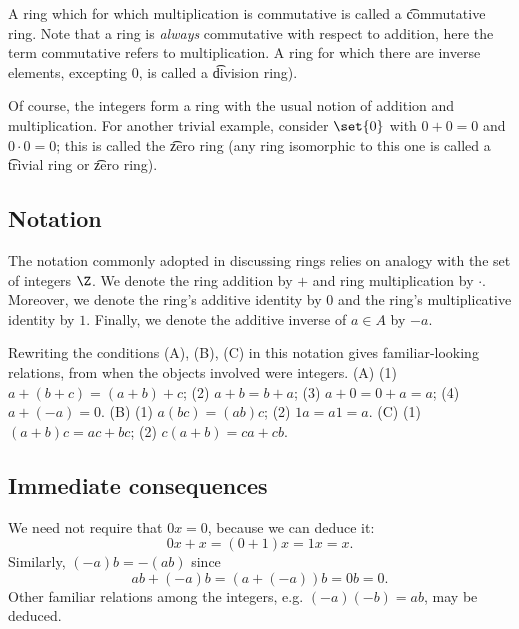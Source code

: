 A ring which for which multiplication is commutative is called a \t{commutative ring}.
Note that a ring is \textit{always} commutative with respect to addition, here the term commutative refers to multiplication.
A ring for which there are inverse elements, excepting 0, is called a \t{division ring}).

Of course, the integers form a ring with the usual notion of addition and multiplication.
For another trivial example, consider $\set{0}$ with $0+0 = 0$ and $0\cdot 0 = 0$; this is called the \t{zero ring} (any ring isomorphic to this one is called a \t{trivial ring} or \t{zero ring}).


\subsection*{Notation}

The notation commonly adopted in discussing rings relies on analogy with the set of integers $\Z $.
We denote the ring addition by $+$ and ring multiplication by $\cdot $.
Moreover, we denote the ring's additive identity by $0$ and the ring's multiplicative identity by $1$.
Finally, we denote the additive inverse of $a \in A$ by $-a$.

Rewriting the conditions (A), (B), (C) in this notation gives familiar-looking relations, from when the objects involved were integers.
(A) (1) $a+(b + c) = (a+b)+c$; (2) $a+b = b+a$; (3) $a + 0 = 0 + a = a$; (4) $a + (-a) = 0$.
(B) (1) $a(bc) = (ab)c$; (2) $1a = a1 = a$.
(C) (1) $(a+b)c = ac + bc$; (2) $c(a+b) = ca + cb$.

\subsection*{Immediate consequences}

We need not require that $0x = 0$, because we can deduce it:
\[
0x + x = (0 + 1)x = 1x = x.
\]
Similarly, $(-a)b = -(ab)$ since
\[
ab + (-a)b = (a + (-a))b = 0b = 0.
\]
Other familiar relations among the integers, e.g. $(-a)(-b) = ab$, may be deduced.
